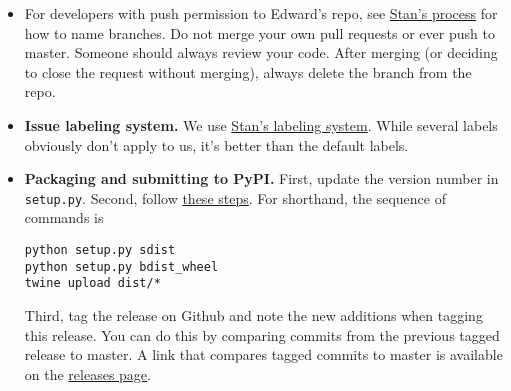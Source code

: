 \begin{itemize}
\item
  For developers with push permission to Edward's repo, see
  \href{https://github.com/stan-dev/stan/wiki/Developer-Process#information-to-include-in-pull-request}{Stan's
  process} for how to name branches. Do not merge your own pull
  requests or ever push to master. Someone should always review your
  code. After merging (or deciding to close the request without
  merging), always delete the branch from the repo.
\item
  \textbf{Issue labeling system.} We use
  \href{https://github.com/stan-dev/stan/issues}{Stan's labeling system}.
  While several labels obviously don't apply to us, it's better than the
  default labels.
\item
  \textbf{Packaging and submitting to PyPI.} First, update the version
  number in \texttt{setup.py}. Second, follow
  \href{https://packaging.python.org/en/latest/distributing/\#packaging-your-project}{these
  steps}. For shorthand, the sequence of commands is

\begin{lstlisting}[class=JSON]
python setup.py sdist
python setup.py bdist_wheel
twine upload dist/*
\end{lstlisting}

  Third, tag the release on Github and note the new additions when
  tagging this release. You can do this by comparing commits from the
  previous tagged release to master. A link that compares tagged commits
  to master is available on the
  \href{https://github.com/blei-lab/edward/releases}{releases page}.
\end{itemize}
